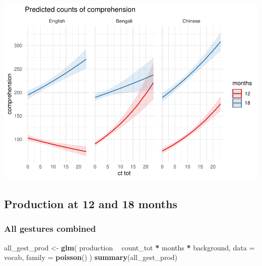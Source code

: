 \documentclass[]{article}
\newenvironment{Shaded}{\begin{snugshade}}{\end{snugshade}}
\newcommand{\DataTypeTok}[1]{\textcolor[rgb]{0.13,0.29,0.53}{#1}}
\newcommand{\KeywordTok}[1]{\textcolor[rgb]{0.13,0.29,0.53}{\textbf{#1}}}
\newcommand{\NormalTok}[1]{#1}
\newcommand{\OperatorTok}[1]{\textcolor[rgb]{0.81,0.36,0.00}{\textbf{#1}}}
\newcommand{\StringTok}[1]{\textcolor[rgb]{0.31,0.60,0.02}{#1}}
\begin{document}
\includegraphics{supplement_files/figure-latex/ct-lm-2-plot-1.pdf}

\hypertarget{production-at-12-and-18-months}{%
\subsection{Production at 12 and 18
months}\label{production-at-12-and-18-months}}

\hypertarget{all-gestures-combined-1}{%
\subsubsection{All gestures combined}\label{all-gestures-combined-1}}

\begin{Shaded}
\begin{Highlighting}[]
\NormalTok{all_gest_prod <-}\StringTok{ }\KeywordTok{glm}\NormalTok{(}
\NormalTok{  production }\OperatorTok{~}
\StringTok{    }\NormalTok{count_tot }\OperatorTok{*}
\StringTok{    }\NormalTok{months }\OperatorTok{*}
\StringTok{    }\NormalTok{background,}
  \DataTypeTok{data =}\NormalTok{ vocab,}
  \DataTypeTok{family =} \KeywordTok{poisson}\NormalTok{()}
\NormalTok{)}
\KeywordTok{summary}\NormalTok{(all_gest_prod)}
\end{Highlighting}
\end{Shaded}
\end{document}
